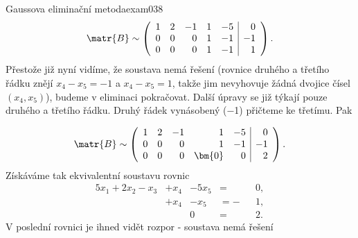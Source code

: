 \begin{mathexam}{Gaussova eliminační metoda}{exam038}
\begin{equation*}
      \matr{B} \sim
      \left(
        \begin{array}{rrrrr|r}
                1 &  2 & -1 & 1 & -5 &  0    \\
                0 &  0 &  0 & 1 & -1 & -1    \\
                0 &  0 &  0 & 1 & -1 &  1
        \end{array}
      \right).
    \end{equation*}
  \endgroup  
  Přestože již nyní vidíme, že soustava nemá řešení (rovnice druhého a třetího řádku znějí \(x_4 -
  x_5 = - 1\) a \(x_4 -x_5 = 1\), takže jim nevyhovuje žádná dvojice čísel \((x_4, x_5)\)), budeme
  v eliminaci pokračovat. Další úpravy se již týkají pouze druhého a třetího řádku. Druhý řádek
  vynásobený (\num{-1}) přičteme ke třetímu. Pak

  \begingroup
  \renewcommand\arraystretch{1.0}
  \renewcommand\arraycolsep{3pt}
    \begin{equation*}
      \matr{B} \sim
      \left(
        \begin{array}{rrrrr|r}
                1 &  2 & -1 & 1      & -5 &  0    \\
                0 &  0 &  0 & 1      & -1 & -1    \\
                0 &  0 &  0 & \bm{0} &  0 &  2
        \end{array}
      \right).
    \end{equation*}
  \endgroup  
  Získáváme tak ekvivalentní soustavu rovnic
  \begin{alignat*}{5}
        x_1 + 2x_2 - x_3 &+  x_4 &- 5x_5 &=  &&0, \\
                         &+  x_4 &-  x_5 &= -&&1, \\
                         &       &     0 &=  &&2.
  \end{alignat*}
  V poslední rovnici je ihned vidět rozpor - soustava nemá řešení
\end{mathexam}